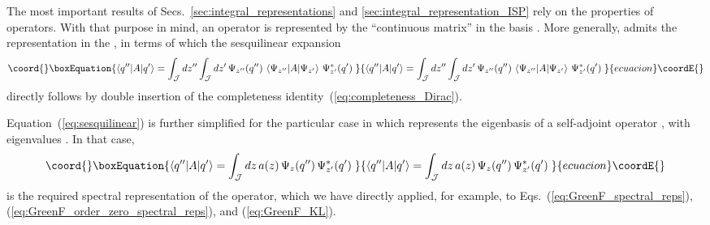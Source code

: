 \documentclass[a4paper,preprint,draft,showpacs,amsmath,amsfonts,amssymb,aps,prd]{revtex4}%
\begin{document}
The most important results of Secs.~\ref{sec:integral_representations} and 
\ref{sec:integral_representation_ISP}
rely on the properties of operators. With that purpose in mind, an
operator \coordHE{} is represented by the ``continuous matrix''
\coordHE{}  in the basis \coordHE{}.
More generally, \coordHE{} admits the representation
\coordHE{}
in the
\coordHE{},
 in terms of which the sesquilinear expansion 
\begin{equation}\coord{}\boxEquation{
\left\langle 
q'' |A| q'
\right\rangle
=
\int_{\mathcal J}
dz'' 
\int_{\mathcal J}
dz' 
\,
\Psi_{z''} (q'')
\,
\left\langle
\Psi_{z''}
 |A| 
\Psi_{z'}
\right\rangle
\,
\Psi_{z'}^{*}(q') 
\;
\label{eq:sesquilinear}
}{
\left\langle 
q'' |A| q'
\right\rangle
=
\int_{\mathcal J}
dz'' 
\int_{\mathcal J}
dz' 
\,
\Psi_{z''} (q'')
\,
\left\langle
\Psi_{z''}
 |A| 
\Psi_{z'}
\right\rangle
\,
\Psi_{z'}^{*}(q') 
\;
}{ecuacion}\coordE{}\end{equation}
directly follows
by double insertion of the completeness identity~(\ref{eq:completeness_Dirac}).

Equation~(\ref{eq:sesquilinear}) is further simplified for the particular case in which 
\coordHE{}
represents the eigenbasis of a self-adjoint operator \coordHE{},
with eigenvalues \coordHE{}. In that case,
\begin{equation}\coord{}\boxEquation{
\left\langle 
q'' |A| q'
\right\rangle
=
\int_{\mathcal J}
dz
\,
a(z)
\,
\Psi_{z} (q'')
\,
\Psi_{z'}^{*}(q') 
\;
\label{eq:spectral_reps}
}{
\left\langle 
q'' |A| q'
\right\rangle
=
\int_{\mathcal J}
dz
\,
a(z)
\,
\Psi_{z} (q'')
\,
\Psi_{z'}^{*}(q') 
\;
}{ecuacion}\coordE{}\end{equation}
is the required spectral representation of the operator,
which we have directly applied, for example, to 
Eqs.~(\ref{eq:GreenF_spectral_reps}),
(\ref{eq:GreenF_order_zero_spectral_reps}),
and (\ref{eq:GreenF_KL}).
\end{document}
